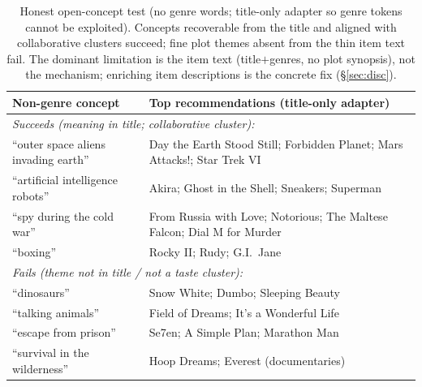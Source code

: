 \begin{table}[h]\centering\small
\begin{tabular}{l p{8.6cm}}
\toprule
Non-genre concept & Top recommendations (title-only adapter)\\
\midrule
\multicolumn{2}{l}{\emph{Succeeds (meaning in title; collaborative cluster):}}\\
``outer space aliens invading earth'' & Day the Earth Stood Still; Forbidden Planet; Mars Attacks!; Star Trek VI\\
``artificial intelligence robots'' & Akira; Ghost in the Shell; Sneakers; Superman\\
``spy during the cold war'' & From Russia with Love; Notorious; The Maltese Falcon; Dial M for Murder\\
``boxing'' & Rocky II; Rudy; G.I.\ Jane\\
\midrule
\multicolumn{2}{l}{\emph{Fails (theme not in title / not a taste cluster):}}\\
``dinosaurs'' & Snow White; Dumbo; Sleeping Beauty\\
``talking animals'' & Field of Dreams; It's a Wonderful Life\\
``escape from prison'' & Se7en; A Simple Plan; Marathon Man\\
``survival in the wilderness'' & Hoop Dreams; Everest (documentaries)\\
\bottomrule
\end{tabular}
\caption{Honest open-concept test (no genre words; title-only adapter so genre tokens cannot be exploited). Concepts
recoverable from the title and aligned with collaborative clusters succeed; fine plot themes absent from the thin
item text fail. The dominant limitation is the item text (title$+$genres, no plot synopsis), not the mechanism;
enriching item descriptions is the concrete fix (\S\ref{sec:disc}).}
\label{tab:concepts}
\end{table}

